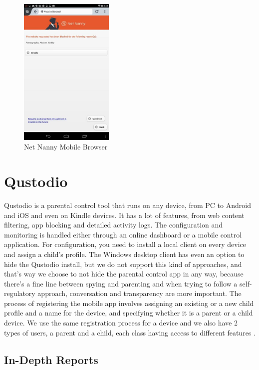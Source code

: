 \begin{figure}[th]
\centering
\includegraphics[width=0.4\textwidth]{Figures/netnanny-site-blocked}
\decoRule
\caption{Net Nanny Mobile Browser}
\label{fig:netnanny-site-blocked}
\end{figure}

\section{Qustodio}

Qustodio \citep{qustodio} is a parental control tool that runs on any device, from PC to Android and iOS and even on Kindle devices. It has a lot of features, from web content filtering, app blocking and detailed activity logs. The configuration and monitoring is handled either through an online dashboard or a mobile control application. For configuration, you need to install a local client on every device and assign a child's profile. The Windows desktop client has even an option to hide the Qustodio install, but we do not support this kind of approaches, and that's way we choose to not hide the parental control app in any way, because there's a fine line between spying and parenting and when trying to follow a self-regulatory approach, conversation and transparency are more important. The process of registering the mobile app involves assigning an existing or a new child profile and a name for the device, and specifying whether it is a parent or a child device. We use the same registration process for a device and we also have 2 types of users, a parent and a child, each class having access to different features \citep{qustodioPCMag}.

\subsection{In-Depth Reports}

